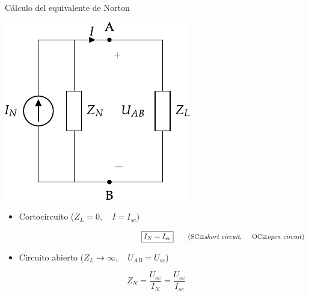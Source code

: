 \documentclass[aspectratio=169, usenames,svgnames,dvipsnames]{beamer}
\begin{document}
\begin{frame}{Cálculo del equivalente de Norton}

    \vspace{2mm} 
    \begin{center}
        \includegraphics[height=0.43\textheight]{../figs/EquivalenteNorton.pdf}
    \end{center}
    
    \begin{itemize}
        \item Cortocircuito (\(Z_L = 0, \quad I = I_{sc}\))
    \end{itemize}

    \vspace{-8mm}
    \[
        \hspace{65mm}
        \boxed{I_N = I_{sc}}
        \qquad \textrm{(\small{SC$\equiv$\textit{short circuit}, \hspace*{4mm}OC$\equiv$\textit{open circuit}})}
    \]  
    
    \vspace{1mm}
    \begin{itemize}
        \item Circuito abierto (\(Z_L \to \infty, \quad U_{AB} = U_{oc}\))
    \end{itemize}
    \[
        \boxed{Z_N = \frac{U_{oc}}{I_N} = \frac{U_{oc}}{I_{sc}}}
    \]
\end{frame}

\end{document}
